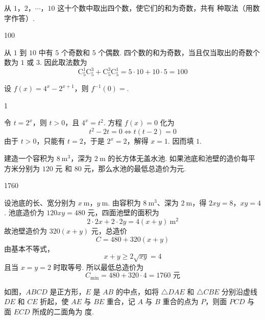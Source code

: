 \begin{problem}
从 \(1\)，\(2\)，\(\cdots\)，\(10\) 这十个数中取出四个数，使它们的和为奇数，共有\fillinblank{} 种取法（用数字作答）.
\end{problem}

\begin{answer}
100
\end{answer}

\begin{solution}
从 \(1\) 到 \(10\) 中有 \(5\) 个奇数和 \(5\) 个偶数. 四个数的和为奇数，当且仅当取出的奇数个数为 \(1\) 或 \(3\). 因此取法数为
\[
\mathrm C_5^1\mathrm C_5^3+\mathrm C_5^3\mathrm C_5^1
=5\cdot10+10\cdot5=100
\]
\end{solution}

\begin{problem}
设 \(f(x)=4^x-2^{x+1}\)，则 \(f^{-1}(0)=\)\fillinblank{}.
\end{problem}

\begin{answer}
1
\end{answer}

\begin{solution}
令 \(t=2^x\)，则 \(t>0\)，且 \(4^x=t^2\). 方程 \(f(x)=0\) 化为
\[
t^2-2t=0
\Longleftrightarrow
t(t-2)=0
\]
由于 \(t>0\)，只能有 \(t=2\)，于是 \(2^x=2\)，解得 \(x=1\). 因而填 \(1\).
\end{solution}

\begin{problem}
建造一个容积为 \(8\mathrm{~m}^3\)，深为 \(2\mathrm{~m}\) 的长方体无盖水池. 如果池底和池壁的造价每平方米分别为 \(120\text{ 元}\) 和 \(80\text{ 元}\)，那么水池的最低总造价为\fillinblank{}\(\text{元}\).
\end{problem}

\begin{answer}
1760
\end{answer}

\begin{solution}
设池底的长、宽分别为 \(x\mathrm{~m}\)，\(y\mathrm{~m}\). 由容积为 \(8\mathrm{~m}^3\)、深为 \(2\mathrm{~m}\)，得
\(2xy=8\)，\(xy=4\).
池底造价为 \(120xy=480\) 元，四面池壁的面积为
\[
2\cdot2x+2\cdot2y=4(x+y)\mathrm{~m}^2
\]
故池壁造价为 \(320(x+y)\) 元，总造价
\[
C=480+320(x+y)
\]
由基本不等式，
\[
x+y\geq2\sqrt{xy}=4
\]
且当 \(x=y=2\) 时取等号. 所以最低总造价为
\[
C_{\min}=480+320\cdot4=1760\text{ 元}
\]
\end{solution}

\begin{problem}
如图，\(ABCD\) 是正方形，\(E\) 是 \(AB\) 的中点，如将 \(\triangle DAE\) 和 \(\triangle CBE\) 分别沿虚线 \(DE\) 和 \(CE\) 折起，使 \(AE\) 与 \(BE\) 重合，记 \(A\) 与 \(B\) 重合的点为 \(P\)，则面 \(PCD\) 与面 \(ECD\) 所成的二面角为\fillinblank{} 度.

\FloatBarrier
\end{problem}

